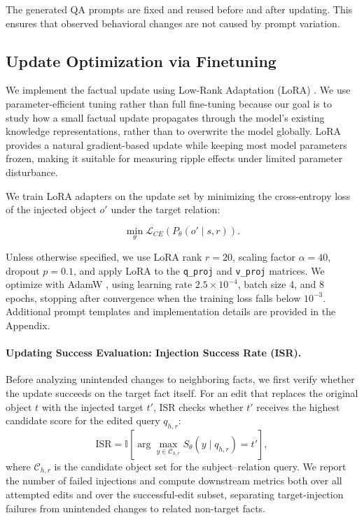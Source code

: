 The generated QA prompts are fixed and reused before and after updating. This ensures that observed behavioral changes are not caused by prompt variation.

\subsection{Update Optimization via Finetuning}

We implement the factual update using Low-Rank Adaptation (LoRA) \cite{hu2021lora}. We use parameter-efficient tuning rather than full fine-tuning because our goal is to study how a small factual update propagates through the model's existing knowledge representations, rather than to overwrite the model globally. LoRA provides a natural gradient-based update while keeping most model parameters frozen, making it suitable for measuring ripple effects under limited parameter disturbance.

We train LoRA adapters on the update set by minimizing the cross-entropy loss of the injected object $o'$ under the target relation:

\[
\min_{\theta} \mathcal{L}_{CE}(P_{\theta}(o' \mid s,r)).
\]

Unless otherwise specified, we use LoRA rank $r=20$, scaling factor $\alpha=40$, dropout $p=0.1$, and apply LoRA to the \texttt{q\_proj} and \texttt{v\_proj} matrices. We optimize with AdamW \cite{loshchilov2019decoupled}, using learning rate $2.5 \times 10^{-4}$, batch size 4, and 8 epochs, stopping after convergence when the training loss falls below $10^{-3}$. Additional prompt templates and implementation details are provided in the Appendix.


\paragraph{Updating Success Evaluation: Injection Success Rate (ISR).}
Before analyzing unintended changes to neighboring facts, we first verify whether the update succeeds on the target fact itself. For an edit that replaces the original object $t$ with the injected target $t'$, ISR checks whether $t'$ receives the highest candidate score for the edited query $q_{h,r}$:
\begin{equation}
    \text{ISR}
    =
    \mathbb{I}
    \left[
    \arg\max_{y \in \mathcal{C}_{h,r}}
    S_\theta(y \mid q_{h,r})
    =
    t'
    \right],
    \label{eq:isr}
\end{equation}
where $\mathcal{C}_{h,r}$ is the candidate object set for the subject--relation query. We report the number of failed injections and compute downstream metrics both over all attempted edits and over the successful-edit subset, separating target-injection failures from unintended changes to related non-target facts.

